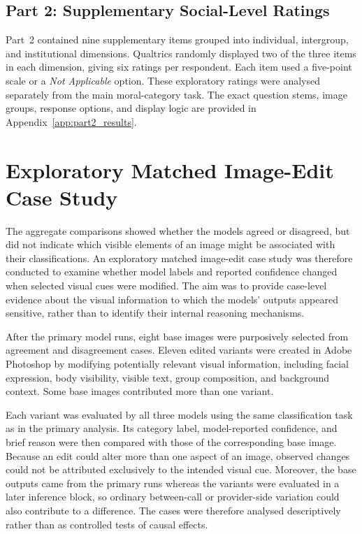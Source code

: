 \subsection{Part 2: Supplementary Social-Level Ratings}
\label{subsec:survey_part2}

Part~2 contained nine supplementary items grouped into individual,
intergroup, and institutional dimensions. Qualtrics randomly displayed two of
the three items in each dimension, giving six ratings per respondent. Each
item used a five-point scale or a \textit{Not Applicable} option. These
exploratory ratings were analysed separately from the main moral-category
task. The exact question stems, image groups, response options, and display
logic are provided in
Appendix~\ref{app:part2_results}.

\section{Exploratory Matched Image-Edit Case Study}
\label{sec:visual_cue_sensitivity}

The aggregate comparisons showed whether the models agreed or disagreed, but
did not indicate which visible elements of an image might be associated with
their classifications. An exploratory matched image-edit case study was
therefore conducted to examine whether model labels and reported confidence
changed when selected visual cues were modified. The aim was to provide
case-level evidence about the visual information to which the models'
outputs appeared sensitive, rather than to identify their internal reasoning
mechanisms.

After the primary model runs, eight base images were purposively selected from
agreement and disagreement cases. Eleven edited variants were created in Adobe
Photoshop by modifying potentially relevant visual information, including
facial expression, body visibility, visible text, group composition, and
background context. Some base images contributed more than one variant.

Each variant was evaluated by all three models using the same classification
task as in the primary analysis. Its category label, model-reported confidence,
and brief reason were then compared with those of the corresponding base
image. Because an edit could alter more than one aspect of an image, observed
changes could not be attributed exclusively to the intended visual cue.
Moreover, the base outputs came from the primary runs whereas the variants
were evaluated in a later inference block, so ordinary between-call or
provider-side variation could also contribute to a difference. The cases were
therefore analysed descriptively rather than as controlled tests of causal
effects.

